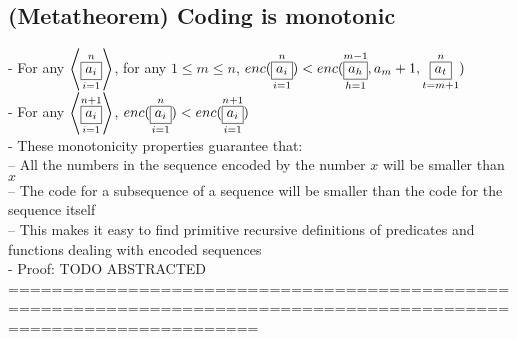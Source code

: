 \documentclass{book}
\newcommand{\seq}[1]{\left\langle #1 \right\rangle}
\newcommand{\vdc}[3]{\underset{#2}{\overset{#3}{\fbox{$#1$}}}}
\begin{document}
\subsection{(Metatheorem) Coding is monotonic} %
	- For any $\seq{\vdc{a_i}{i=1}{n}}$, for any $1 \leq m \leq n$, $enc(\vdc{a_i}{i=1}{n}) < enc(\vdc{a_h}{h=1}{m-1}, a_m+1, \vdc{a_t}{t=m+1}{n})$ \\
	- For any $\seq{\vdc{a_i}{i=1}{n+1}}$, $enc(\vdc{a_i}{i=1}{n}) < enc(\vdc{a_i}{i=1}{n+1})$ \\
	- These monotonicity properties guarantee that: \\
		-- All the numbers in the sequence encoded by the number $x$ will be smaller than $x$ \\
		-- The code for a subsequence of a sequence will be smaller than the code for the sequence itself \\
		-- This makes it easy to find primitive recursive definitions of predicates and functions dealing with encoded sequences \\
	- Proof: TODO ABSTRACTED \\
	===================================================================================================================
\end{document}
